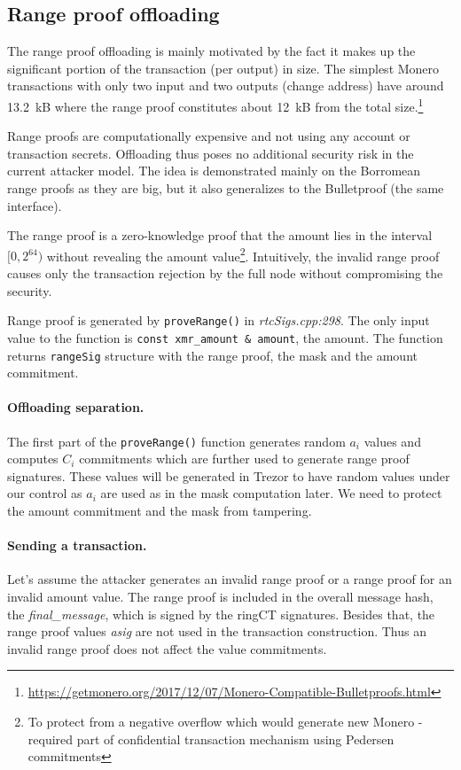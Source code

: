 \documentclass[]{article}
\begin{document}
\subsection{Range proof offloading}
The range proof offloading is mainly motivated by the fact it makes up the significant portion of the transaction (per output) in size. The simplest Monero transactions with only two input and two outputs (change address) have around 
13.2~kB where the range proof constitutes about 12~kB from the total size.\footnote{\url{https://getmonero.org/2017/12/07/Monero-Compatible-Bulletproofs.html}}
 
Range proofs are computationally expensive and not using any account or transaction secrets. Offloading thus poses no additional security risk in the current attacker model. The idea is demonstrated mainly on the Borromean range proofs as they are big, but it also generalizes to the Bulletproof (the same interface). 

The range proof is a zero-knowledge proof that the amount lies in the interval $[0, 2^{64})$ without revealing the amount value\footnote{To protect from a negative overflow which would generate new Monero - required part of confidential transaction mechanism using Pedersen commitments}. Intuitively, the invalid range proof causes only the transaction rejection by the full node without compromising the security.

Range proof is generated by \verb|proveRange()| in \emph{rtcSigs.cpp:298}. The only input value to the function is \verb|const xmr_amount & amount|, the amount. The function returns \verb|rangeSig| structure with the range proof, the mask and the amount commitment. 

\paragraph{Offloading separation.}
The first part of the \verb|proveRange()| function generates random $a_i$ values and computes $C_i$ commitments which are further used to generate range proof signatures. These values will be generated in Trezor to have random values under our control as $a_i$ are used as in the mask computation later. We need to protect the amount commitment and the mask from tampering.

\paragraph{Sending a transaction.}
Let's assume the attacker generates an invalid range proof or a range proof for an invalid amount value. The range proof is included in the overall message hash, the \emph{final\_message}, which is signed by the ringCT signatures. Besides that, the range proof values \emph{asig} are not used in the transaction construction. Thus an invalid range proof does not affect the value commitments. 
\end{document}
